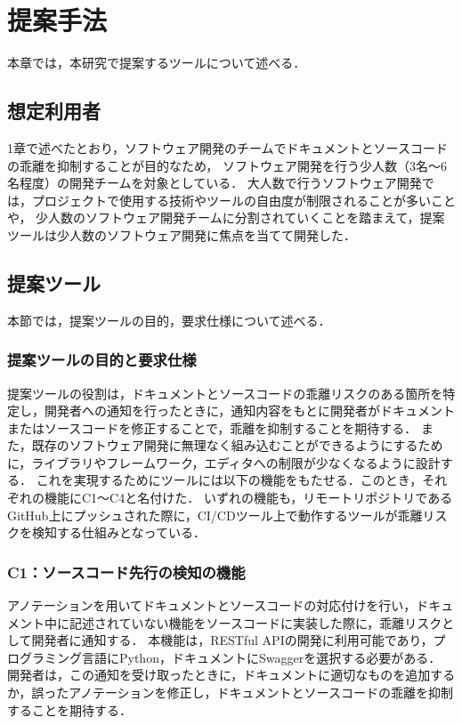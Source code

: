 \chapter{提案手法}
本章では，本研究で提案するツールについて述べる．

\section{想定利用者}
1章で述べたとおり，ソフトウェア開発のチームでドキュメントとソースコードの乖離を抑制することが目的なため，
ソフトウェア開発を行う少人数（3名〜6名程度）の開発チームを対象としている．
大人数で行うソフトウェア開発では，プロジェクトで使用する技術やツールの自由度が制限されることが多いことや，
少人数のソフトウェア開発チームに分割されていくことを踏まえて，提案ツールは少人数のソフトウェア開発に焦点を当てて開発した．

\section{提案ツール}
\label{tool}
本節では，提案ツールの目的，要求仕様について述べる．

\subsection{提案ツールの目的と要求仕様}
提案ツールの役割は，ドキュメントとソースコードの乖離リスクのある箇所を特定し，開発者への通知を行ったときに，通知内容をもとに開発者がドキュメントまたはソースコードを修正することで，乖離を抑制することを期待する．
また，既存のソフトウェア開発に無理なく組み込むことができるようにするために，ライブラリやフレームワーク，エディタへの制限が少なくなるように設計する．
これを実現するためにツールには以下の機能をもたせる．このとき，それぞれの機能にC1〜C4と名付けた．
いずれの機能も，リモートリポジトリであるGitHub上にプッシュされた際に，CI/CDツール上で動作するツールが乖離リスクを検知する仕組みとなっている．

\subsection{C1：ソースコード先行の検知の機能}
\label{c1}
アノテーションを用いてドキュメントとソースコードの対応付けを行い，ドキュメント中に記述されていない機能をソースコードに実装した際に，乖離リスクとして開発者に通知する．
本機能は，RESTful APIの開発に利用可能であり，プログラミング言語にPython，ドキュメントにSwaggerを選択する必要がある．
開発者は，この通知を受け取ったときに，ドキュメントに適切なものを追加するか，誤ったアノテーションを修正し，ドキュメントとソースコードの乖離を抑制することを期待する．

